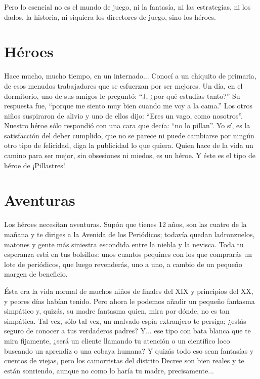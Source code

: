 Pero lo esencial no es el mundo de juego, ni la fantasía, ni las estrategias, ni los dados, la historia, ni siquiera los directores de juego, sino los héroes.

\section{Héroes}

Hace mucho, mucho tiempo, en un internado... Conocí a un chiquito de primaria, de esos menudos trabajadores que se esfuerzan por ser mejores. Un día, en el dormitorio, uno de sus amigos le preguntó: \enquote{J, ¿por qué estudias tanto?} Su respuesta fue, \enquote{porque me siento muy bien cuando me voy a la cama.} Los otros niños suspiraron de alivio y uno de ellos dijo: \enquote{Eres un vago, como nosotros}. Nuestro héroe sólo respondió con una cara que decía: \enquote{no lo pillan}. Yo sí, es la satisfacción del deber cumplido, que no se parece ni puede cambiarse por ningún otro tipo de felicidad, diga la publicidad lo que quiera. Quien hace de la vida un camino para ser mejor, sin obsesiones ni miedos, es un héroe. Y éste es el tipo de héroe de ¡Pillastres!

\section{Aventuras}

Los héroes necesitan aventuras. Supón que tienes 12 años, son las cuatro de la mañana y te diriges a la Avenida de los Periódicos; todavía quedan ladronzuelos, matones y gente más siniestra escondida entre la niebla y la nevisca. Toda tu esperanza está en tus bolsillos: unos cuantos pequines con los que comprarás un lote de periódicos, que luego revenderás, uno a uno, a cambio de un pequeño margen de beneficio.

Ésta era la vida normal de muchos niños de finales del XIX y principios del XX, y peores días habían tenido. Pero ahora le podemos añadir un pequeño fantasma simpático y, quizás, su madre fantasma quien, mira por dónde, no es tan simpática. Tal vez, sólo tal vez, un malvado espía extranjero te persiga; ¿estás seguro de conocer a tus verdaderos padres? Y... ese tipo con bata blanca que te mira fijamente, ¿será un cliente llamando tu atención o un científico loco buscando un aprendiz o una cobaya humana? Y quizás todo eso sean fantasías y cuentos de viejas, pero los camorristas del distrito Decree son bien reales y te están sonriendo, aunque no como lo haría tu madre, precisamente...

